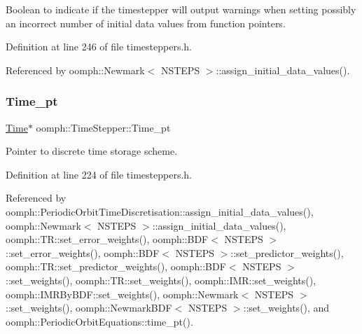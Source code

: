 Boolean to indicate if the timestepper will output warnings when setting possibly an incorrect number of initial data values from function pointers. 



Definition at line 246 of file timesteppers.\+h.



Referenced by oomph\+::\+Newmark$<$ N\+S\+T\+E\+P\+S $>$\+::assign\+\_\+initial\+\_\+data\+\_\+values().

\mbox{\label{classoomph_1_1TimeStepper_a38740bc33e75ecfd61746ff43be54358}} 
\subsubsection{\texorpdfstring{Time\+\_\+pt}{Time\_pt}}
{\footnotesize\ttfamily \hyperlink{classoomph_1_1Time}{Time}$\ast$ oomph\+::\+Time\+Stepper\+::\+Time\+\_\+pt\hspace{0.3cm}{\ttfamily [protected]}}



Pointer to discrete time storage scheme. 



Definition at line 224 of file timesteppers.\+h.



Referenced by oomph\+::\+Periodic\+Orbit\+Time\+Discretisation\+::assign\+\_\+initial\+\_\+data\+\_\+values(), oomph\+::\+Newmark$<$ N\+S\+T\+E\+P\+S $>$\+::assign\+\_\+initial\+\_\+data\+\_\+values(), oomph\+::\+T\+R\+::set\+\_\+error\+\_\+weights(), oomph\+::\+B\+D\+F$<$ N\+S\+T\+E\+P\+S $>$\+::set\+\_\+error\+\_\+weights(), oomph\+::\+B\+D\+F$<$ N\+S\+T\+E\+P\+S $>$\+::set\+\_\+predictor\+\_\+weights(), oomph\+::\+T\+R\+::set\+\_\+predictor\+\_\+weights(), oomph\+::\+B\+D\+F$<$ N\+S\+T\+E\+P\+S $>$\+::set\+\_\+weights(), oomph\+::\+T\+R\+::set\+\_\+weights(), oomph\+::\+I\+M\+R\+::set\+\_\+weights(), oomph\+::\+I\+M\+R\+By\+B\+D\+F\+::set\+\_\+weights(), oomph\+::\+Newmark$<$ N\+S\+T\+E\+P\+S $>$\+::set\+\_\+weights(), oomph\+::\+Newmark\+B\+D\+F$<$ N\+S\+T\+E\+P\+S $>$\+::set\+\_\+weights(), and oomph\+::\+Periodic\+Orbit\+Equations\+::time\+\_\+pt().

\mbox{\label{classoomph_1_1TimeStepper_a39dfe6cf216263d547c430d6f7a67530}} 
